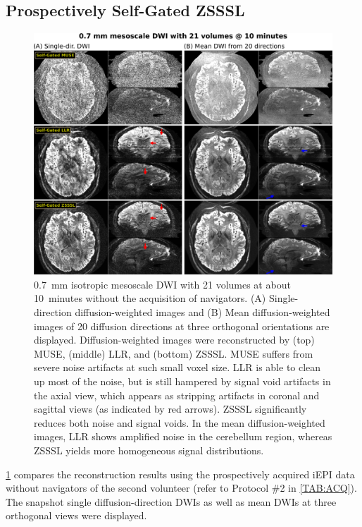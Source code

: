 \documentclass[journal,twoside,web]{ieeecolor}
\begin{document}
	\subsection{Prospectively Self-Gated ZSSSL}

	\begin{figure}
		\centering
		\includegraphics[width=\textwidth]{../figures/fig4.png}
		\caption{0.7~mm isotropic mesoscale DWI with 21 volumes at about 10~minutes
			without the acquisition of navigators.
			(A) Single-direction diffusion-weighted images and
			(B) Mean diffusion-weighted images of 20 diffusion directions
			at three orthogonal orientations are displayed.
			Diffusion-weighted images were reconstructed by
			(top) MUSE, (middle) LLR, and (bottom) ZSSSL.
			MUSE suffers from severe noise artifacts at such small voxel size.
			LLR is able to clean up most of the noise,
			but is still hampered by signal void artifacts in the axial view,
			which appears as stripping artifacts in coronal and sagittal views
			(as indicated by red arrows).
			ZSSSL significantly reduces both noise and signal voids.
			In the mean diffusion-weighted images, LLR shows amplified noise
			in the cerebellum region,
			whereas ZSSSL yields more homogeneous signal distributions.}
		\label{FIG:MOTION_PROS}
	\end{figure}

	\cref{FIG:MOTION_PROS} compares the reconstruction results
	using the prospectively acquired iEPI data without navigators
	of the second volunteer
	(refer to Protocol \#2 in \cref{TAB:ACQ}).
	The snapshot single diffusion-direction DWIs
	as well as mean DWIs 
	at three orthogonal views were displayed.
	
\end{document}
